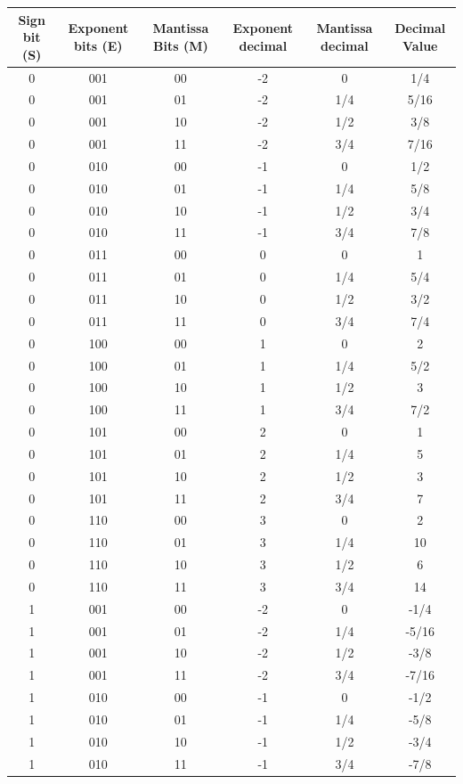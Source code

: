 \documentclass{article}
\begin{document}
\begin{tabular}{|c|c|c|c|c|c|}
    \hline
    Sign bit (S) & Exponent bits (E) & Mantissa Bits (M) & Exponent decimal & Mantissa decimal & Decimal Value \\
    \hline
    0 & 001 & 00 & -2 & 0 & 1/4 \\
    0 & 001 & 01 & -2 & 1/4 & 5/16 \\
    0 & 001 & 10 & -2 & 1/2 & 3/8 \\
    0 & 001 & 11 & -2 & 3/4 & 7/16 \\
    0 & 010 & 00 & -1 & 0 & 1/2 \\
    0 & 010 & 01 & -1 & 1/4 & 5/8 \\
    0 & 010 & 10 & -1 & 1/2 & 3/4 \\
    0 & 010 & 11 & -1 & 3/4 & 7/8 \\
    0 & 011 & 00 & 0 & 0 & 1 \\
    0 & 011 & 01 & 0 & 1/4 & 5/4 \\
    0 & 011 & 10 & 0 & 1/2 & 3/2 \\
    0 & 011 & 11 & 0 & 3/4 & 7/4 \\
    0 & 100 & 00 & 1 & 0 & 2 \\
    0 & 100 & 01 & 1 & 1/4 & 5/2 \\
    0 & 100 & 10 & 1 & 1/2 & 3 \\
    0 & 100 & 11 & 1 & 3/4 & 7/2 \\
    0 & 101 & 00 & 2 & 0 & 1 \\
    0 & 101 & 01 & 2 & 1/4 & 5 \\
    0 & 101 & 10 & 2 & 1/2 & 3 \\
    0 & 101 & 11 & 2 & 3/4 & 7 \\
    0 & 110 & 00 & 3 & 0 & 2 \\
    0 & 110 & 01 & 3 & 1/4 & 10 \\
    0 & 110 & 10 & 3 & 1/2 & 6 \\
    0 & 110 & 11 & 3 & 3/4 & 14 \\
    1 & 001 & 00 & -2 & 0 & -1/4 \\
    1 & 001 & 01 & -2 & 1/4 & -5/16 \\
    1 & 001 & 10 & -2 & 1/2 & -3/8 \\
    1 & 001 & 11 & -2 & 3/4 & -7/16 \\
    1 & 010 & 00 & -1 & 0 & -1/2 \\
    1 & 010 & 01 & -1 & 1/4 & -5/8 \\
    1 & 010 & 10 & -1 & 1/2 & -3/4 \\
    1 & 010 & 11 & -1 & 3/4 & -7/8 \\

\end{tabular}
\end{document}
